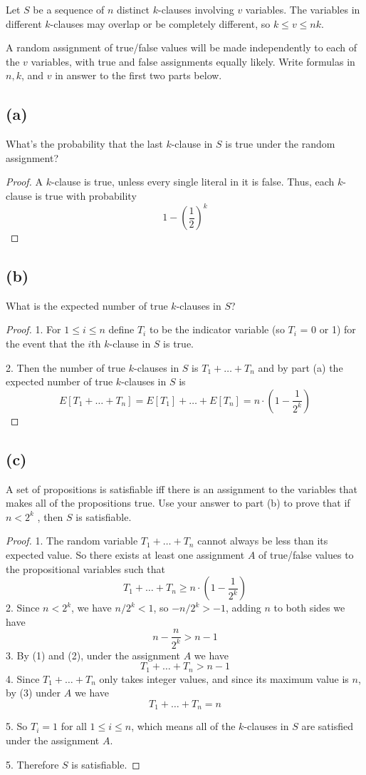 \documentclass[14pt]{extarticle}
\begin{document}
Let $S$ be a sequence of $n$ distinct $k$-clauses involving $v$ variables. The variables in different $k$-clauses may overlap or be completely different, so $k \leq v \leq nk$.

A random assignment of true/false values will be made independently to each of the $v$ variables, with true and false assignments equally likely. Write formulas in $n, k$, and $v$ in answer to the first two parts below.
\subsection{(a)}
What's the probability that the last $k$-clause in $S$ is true under the random assignment?
\begin{proof}
A $k$-clause is true, unless every single literal in it is false. Thus, each $k$-clause is true with probability
$$
1 - \left(\frac{1}{2}\right)^{k}
$$
\end{proof}

\subsection{(b)}
What is the expected number of true $k$-clauses in $S$?
\begin{proof}
1. For $1 \leq i \leq n$ define $T_i$ to be the indicator variable (so $T_i$ = 0 or 1) for the event that the $i$th $k$-clause in $S$ is true. 

2. Then the number of true $k$-clauses in $S$ is $T_1 + \ldots + T_n$
and by part (a) the expected number of true $k$-clauses in $S$ is
$$
E[T_1 + \ldots + T_n] = E[T_1] + \ldots + E[T_n] = n \cdot \left(1 - \frac{1}{2^k}\right)
$$
\end{proof}

\subsection{(c)}
A set of propositions is satisfiable iff there is an assignment to the variables that makes all of the propositions true. Use your answer to part (b) to prove that if $n < 2^k$ , then $S$ is satisfiable.
\begin{proof}
1. The random variable $T_1 + \ldots + T_n$ cannot always be less than its expected value. So there exists at least one assignment $A$ of true/false values to the propositional variables such that
$$
T_1 + \ldots + T_n \geq n \cdot \left(1 - \frac{1}{2^k}\right)
$$
2. Since $n < 2^k$, we have $n / 2^k < 1$, so $-n/2^k > -1$, adding $n$ to both sides we have
$$
n - \frac{n}{2^k} > n-1
$$
3. By (1) and (2), under the assignment $A$ we have
$$
T_1 + \ldots + T_n > n - 1
$$
4. Since $T_1 + \ldots + T_n$ only takes integer values, and since its maximum value is $n$, by (3) under $A$ we have
$$
T_1 + \ldots + T_n = n
$$

5. So $T_i = 1$ for all $1 \leq i \leq n$, which means all of the $k$-clauses in $S$ are satisfied under the assignment $A$.

5. Therefore $S$ is satisfiable.
\end{proof}
\end{document}

